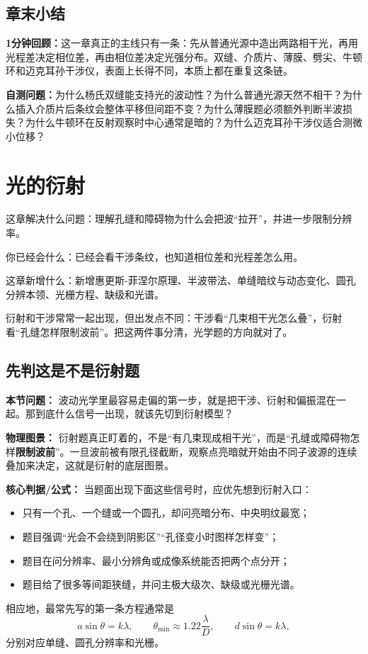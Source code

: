 \documentclass[lang=cn,11pt]{elegantbook}
\newcommand{\bridge}[1]{\begin{note}#1\end{note}}
\newcommand{\chapterroadmap}[3]{%
\begin{introduction}
  \item {\heiti 这章解决什么问题：}#1
  \item {\heiti 你已经会什么：}#2
  \item {\heiti 这章新增什么：}#3
\end{introduction}}
\newcommand{\summaryline}[1]{\par\noindent\textbf{1分钟回顾：}#1\par}
\newcommand{\chapterselfcheck}[1]{\par\noindent\textbf{自测问题：}#1\par}
\begin{document}
\section{章末小结}

\summaryline{这一章真正的主线只有一条：先从普通光源中造出两路相干光，再用光程差决定相位差，再由相位差决定光强分布。双缝、介质片、薄膜、劈尖、牛顿环和迈克耳孙干涉仪，表面上长得不同，本质上都在重复这条链。}
\chapterselfcheck{为什么杨氏双缝能支持光的波动性？为什么普通光源天然不相干？为什么插入介质片后条纹会整体平移但间距不变？为什么薄膜题必须额外判断半波损失？为什么牛顿环在反射观察时中心通常是暗的？为什么迈克耳孙干涉仪适合测微小位移？}

\chapter{光的衍射}

\chapterroadmap
{理解孔缝和障碍物为什么会把波“拉开”，并进一步限制分辨率。}
{已经会看干涉条纹，也知道相位差和光程差怎么用。}
{新增惠更斯-菲涅尔原理、半波带法、单缝暗纹与动态变化、圆孔分辨本领、光栅方程、缺级和光谱。}

\bridge{衍射和干涉常常一起出现，但出发点不同：干涉看“几束相干光怎么叠”，衍射看“孔缝怎样限制波前”。把这两件事分清，光学题的方向就对了。}

\section{先判这是不是衍射题}

\textbf{本节问题：} 波动光学里最容易走偏的第一步，就是把干涉、衍射和偏振混在一起。那到底什么信号一出现，就该先切到衍射模型？

\textbf{物理图景：} 衍射题真正盯着的，不是“有几束现成相干光”，而是“孔缝或障碍物怎样\textbf{限制波前}”。一旦波前被有限孔径截断，观察点亮暗就开始由不同子波源的连续叠加来决定，这就是衍射的底层图景。

\textbf{核心判据/公式：} 当题面出现下面这些信号时，应优先想到衍射入口：
\begin{itemize}
  \item 只有一个孔、一个缝或一个圆孔，却问亮暗分布、中央明纹最宽；
  \item 题目强调“光会不会绕到阴影区”“孔径变小时图样怎样变”；
  \item 题目在问分辨率、最小分辨角或成像系统能否把两个点分开；
  \item 题目给了很多等间距狭缝，并问主极大级次、缺级或光栅光谱。
\end{itemize}
相应地，最常先写的第一条方程通常是
\[
a\sin\theta=k\lambda,\qquad
\theta_{\min}\approx 1.22\frac{\lambda}{D},\qquad
d\sin\theta=k\lambda,
\]
分别对应单缝、圆孔分辨率和光栅。
\end{document}

